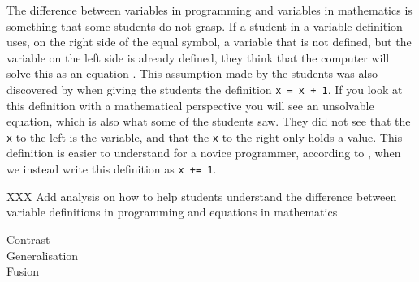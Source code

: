 The difference between variables in programming and variables in 
mathematics is something that some students do not grasp. If a student in a 
variable 
definition uses, on the right side of the equal symbol, a variable that is 
not 
defined, but the variable on the left side is already defined, they think 
that 
the computer will solve this as an equation \parencite{Plass2015Variables}. 
This assumption made by the students was also discovered by 
\textcite{Kohn2017VariableEvaluation} when giving the students the 
definition 
\texttt{x = x + 1}. If you look at this definition with a 
mathematical 
perspective you will see an unsolvable equation, which is also what some of 
the 
students saw. They did not see that the \texttt{x} to the left 
is the 
variable, 
and that the \texttt{x} to the right only holds a value. This 
definition is  
easier to understand for a novice programmer, according to 
\textcite{Kohn2017VariableEvaluation}, when we instead write this 
definition as 
\texttt{x += 1}. 

XXX Add analysis on how to help students understand the difference between 
variable definitions in programming and equations in mathematics

\begin{description}
    \item[Contrast]
    \item[Generalisation]
    \item[Fusion]
\end{description}

\endinput

\subsection{Arguments to functions}

We start with the following example.
\begin{pyblock}[greet]
def greet(name, place):
    print(f"Hello {name}, so you're from {place}?")

def main():
    name = "Ada"
    place = "Computer Town"
    greet(name, place)

main()
\end{pyblock}
The output of running the code will be:
\stdoutpythontex[verbatim]

\subsection{Scope of identifiers}

